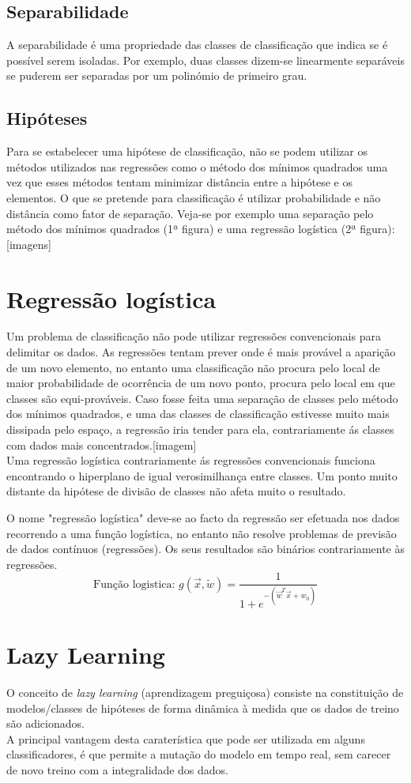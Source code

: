 \documentclass[]{report}
\begin{document}
\subsection{Separabilidade}
A separabilidade é uma propriedade das classes de classificação que indica se é possível serem isoladas.
Por exemplo, duas classes dizem-se linearmente separáveis se puderem ser separadas por um polinómio de primeiro grau.
\subsection{Hipóteses}
Para se estabelecer uma hipótese de classificação, não se podem utilizar os métodos utilizados nas regressões como o método dos mínimos quadrados uma vez que esses métodos tentam minimizar distância entre a hipótese e os elementos.
O que se pretende para classificação é utilizar probabilidade e não distância como fator de separação.
Veja-se por exemplo uma separação pelo método dos mínimos quadrados (1ª figura) e uma regressão logística (2ª figura):[imagens]
\section{Regressão logística}
Um problema de classificação não pode utilizar regressões convencionais para delimitar os dados. As regressões tentam prever onde é mais provável a aparição de um novo elemento, no entanto uma classificação não procura pelo local de maior probabilidade de ocorrência de um novo ponto, procura pelo local em que classes são equi-prováveis. Caso fosse feita uma separação de classes pelo método dos mínimos quadrados, e uma das classes de classificação estivesse muito mais dissipada pelo espaço, a regressão iria tender para ela, contrariamente ás classes com dados mais concentrados.[imagem]\\
Uma regressão logística contrariamente ás regressões convencionais funciona encontrando o hiperplano de igual verosimilhança entre classes. Um ponto muito distante da hipótese de divisão de classes não afeta muito o resultado.\par
O nome "regressão logística" deve-se ao facto da regressão ser efetuada nos dados recorrendo a uma função logística, no entanto não resolve problemas de previsão de dados contínuos (regressões). Os seus resultados são binários contrariamente às regressões.
$$\text{Função logistica: } g(\vec x, \widetilde w) = \frac {1}{1+e^{-(\vec w ^T \vec x + w_0)}}$$
\section{Lazy Learning}
O conceito de \textit{lazy learning} (aprendizagem preguiçosa) consiste na constituição de modelos/classes de hipóteses de forma dinâmica à medida que os dados de treino são adicionados.\\
A principal vantagem desta caraterística que pode ser utilizada em alguns classificadores, é que permite a mutação do modelo em tempo real, sem carecer de novo treino com a integralidade dos dados.
\end{document}
